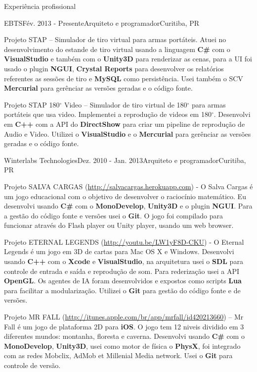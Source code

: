 \documentclass{resume}
\begin{document}
  \begin{rSection}{Experiência profissional}
    \begin{rSubsection}{EBTS}{Fév. 2013 - Presente}{Arquiteto e programador}{Curitiba, PR}
    \item Projeto STAP – Simulador de tiro virtual para armas portáteis. Atuei no desenvolvimento do estande de tiro virtual usando a linguagem \textbf{C\#} com o \textbf{VisualStudio} e também com o \textbf{Unity3D} para renderizar as cenas, para a UI foi usado o plugin \textbf{NGUI}, \textbf{Crystal Reports} para desenvolver os relatórios referentes as sessões de tiro e \textbf{MySQL} como persistência. Usei também o SCV \textbf{Mercurial} para gerênciar as versões geradas e o código fonte. \\
    \item Projeto STAP 180$^\circ$ Video – Simulador de tiro virtual de 180$^\circ$ para armas portáteis que usa video. Implementei a reprodução de videos em 180$^\circ$. Desenvolvi em \textbf{C++} com a API do \textbf{DirectShow} para criar um pipeline de reprodução de Audio e Video. Utilizei o \textbf{VisualStudio} e o \textbf{Mercurial} para gerênciar as versões geradas e o código fonte.
    \end{rSubsection}
    \begin{rSubsection}{Winterlabs Technologies}{Dez. 2010 - Jan. 2013}{Arquiteto e programador}{Curitiba, PR}
    \item Projeto SALVA CARGAS (\url{http://salvacargas.herokuapp.com}) - O Salva Cargas é um jogo educacional com o objetivo de desenvolver o raciocínio matemático. Eu desenvolvi usando \textbf{C\#} com o \textbf{MonoDevelop}, \textbf{Unity3D} e o plugin \textbf{NGUI}. Para a gestão do código fonte e versões usei o \textbf{Git}. O jogo foi compilado para funcionar através do Flash player ou Unity player, usando um web browser. \\
    \item Projeto ETERNAL LEGENDS (\url{http://youtu.be/LW1yF8D-CKU}) - O Eternal Legends é um jogo em 3D de cartas para Mac OS X e Windows. Desenvolvi usando \textbf{C++} com o \textbf{Xcode} e \textbf{VisualStudio}, na arquitetura usei o \textbf{SDL} para controle de entrada e saída e reprodução de som. Para rederização usei a API \textbf{OpenGL}. Os agentes de IA foram desenvolvidos e expostos como scripts \textbf{Lua} para facilitar a modularização. Utilizei o \textbf{Git} para gestão do código fonte e de versões. \\
    \item Projeto MR FALL (\url{http://itunes.apple.com/br/app/mrfall/id420213660}) – Mr Fall é um jogo de plataforma 2D para \textbf{iOS}. O jogo tem 12 niveis dividido em 3 diferentes mundos: montanha, floresta e caverna. Desenvolvi usando \textbf{C\#} com o \textbf{MonoDevelop}, \textbf{Unity3D}, usei como motor de física o \textbf{PhysX}, foi integrado com as redes Mobclix, AdMob et Millenial Media network. Usei o \textbf{Git} para controle de versão. \\

\end{rSubsection}
\end{rSection}
\end{document}
